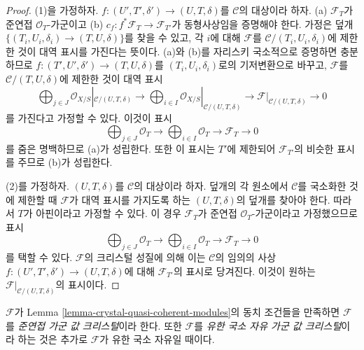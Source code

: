 \begin{proof}
(1)을 가정하자.
$f : (U', T', \delta') \to (U, T, \delta)$를 $\mathcal{C}$의 대상이라 하자.
(a) $\mathcal{F}_T$가 준연접 $\mathcal{O}_T$-가군이고
(b) $c_f : f^*\mathcal{F}_T \to \mathcal{F}_{T'}$가 동형사상임을
증명해야 한다. 가정은 덮개
$\{(T_i, U_i, \delta_i) \to (T, U, \delta)\}$를 찾을 수 있고,
각 $i$에 대해 $\mathcal{F}$를
$\mathcal{C}/(T_i, U_i, \delta_i)$에 제한한 것이 대역 표시를
가진다는 뜻이다. (a)와 (b)를 자리스키 국소적으로 증명하면 충분하므로
$f : (T', U', \delta') \to (T, U, \delta)$를
$(T_i, U_i, \delta_i)$로의 기저변환으로 바꾸고,
$\mathcal{F}$를 $\mathcal{C}/(T, U, \delta)$에 제한한 것이 대역 표시
$$
\bigoplus\nolimits_{j \in J}
\mathcal{O}_{X/S}|_{\mathcal{C}/(U, T, \delta)} \longrightarrow
\bigoplus\nolimits_{i \in I}
\mathcal{O}_{X/S}|_{\mathcal{C}/(U, T, \delta)} \longrightarrow
\mathcal{F}|_{\mathcal{C}/(U, T, \delta)}
\longrightarrow 0
$$
를 가진다고 가정할 수 있다. 이것이 표시
$$
\bigoplus\nolimits_{j \in J} \mathcal{O}_T \longrightarrow
\bigoplus\nolimits_{i \in I} \mathcal{O}_T \longrightarrow
\mathcal{F}_T
\longrightarrow 0
$$
를 줌은 명백하므로 (a)가 성립한다. 또한 이 표시는 $T'$에 제한되어
$\mathcal{F}_{T'}$의 비슷한 표시를 주므로 (b)가 성립한다.

\medskip\noindent
(2)를 가정하자. $(U, T, \delta)$를 $\mathcal{C}$의 대상이라 하자.
덮개의 각 원소에서 $\mathcal{C}$를 국소화한 것에 제한할 때
$\mathcal{F}$가 대역 표시를 가지도록 하는 $(U, T, \delta)$의
덮개를 찾아야 한다. 따라서 $T$가 아핀이라고 가정할 수 있다.
이 경우 $\mathcal{F}_T$가 준연접 $\mathcal{O}_T$-가군이라고
가정했으므로 표시
$$
\bigoplus\nolimits_{j \in J} \mathcal{O}_T \longrightarrow
\bigoplus\nolimits_{i \in I} \mathcal{O}_T \longrightarrow
\mathcal{F}_T
\longrightarrow 0
$$
를 택할 수 있다. $\mathcal{F}$의 크리스털 성질에 의해 이는
$\mathcal{C}$의 임의의 사상
$f : (U', T', \delta') \to (U, T, \delta)$에 대해
$\mathcal{F}_{T'}$의 표시로 당겨진다. 이것이 원하는
$\mathcal{F}|_{\mathcal{C}/(U, T, \delta)}$의 표시이다.
\end{proof}

\begin{definition}
\label{definition-crystal-quasi-coherent-modules}
$\mathcal{F}$가 Lemma \ref{lemma-crystal-quasi-coherent-modules}의
동치 조건들을 만족하면 $\mathcal{F}$를
{\it 준연접 가군 값 크리스털}이라 한다. 또한 $\mathcal{F}$를
{\it 유한 국소 자유 가군 값 크리스털}이라 하는 것은 추가로
$\mathcal{F}$가 유한 국소 자유일 때이다.
\end{definition}

